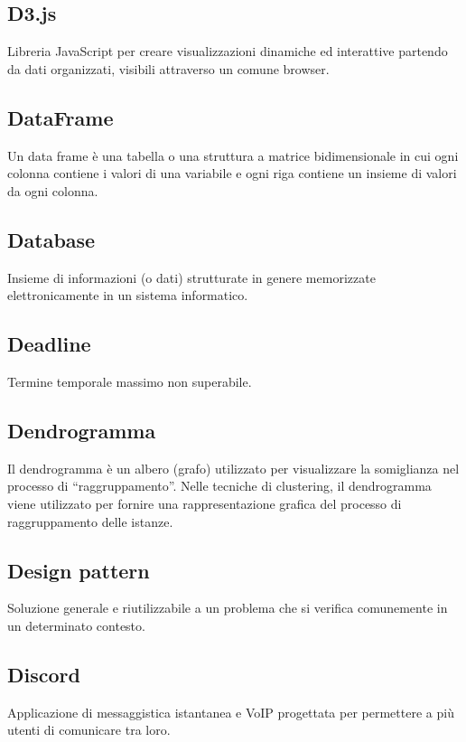 \documentclass[../glossario.tex]{subfiles}
\begin{document}
    
\subsection*{D3.js}
Libreria JavaScript per creare visualizzazioni dinamiche ed interattive partendo da dati organizzati, visibili attraverso un comune browser.


\subsection*{DataFrame}
Un data frame è una tabella o una struttura a matrice bidimensionale in cui ogni colonna contiene i valori di una variabile e ogni riga contiene un insieme di valori da ogni colonna.


\subsection*{Database}
Insieme di informazioni (o dati) strutturate in genere memorizzate elettronicamente in un sistema informatico.

\subsection*{Deadline}
Termine temporale massimo non superabile.

\subsection*{Dendrogramma}
Il dendrogramma è un albero (grafo) utilizzato per visualizzare la somiglianza nel processo di “raggruppamento”. Nelle tecniche di clustering, il dendrogramma viene utilizzato per fornire una rappresentazione grafica del processo di raggruppamento delle istanze.

\subsection*{Design pattern}
Soluzione generale e riutilizzabile a un problema che si verifica comunemente in un determinato contesto.

\subsection*{Discord}
Applicazione di messaggistica istantanea e VoIP progettata per permettere a più utenti di comunicare tra loro.
\end{document}
